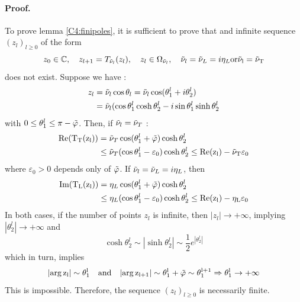 \paragraph*{Proof.} To prove lemma \ref{C4:finipoles}, it is sufficient to prove that and infinite sequence $(z_l)_{l\geq0}$ of the form
\begin{equation}
z_0 \in \mathbb{C}, \hspace{1em} z_{l+1}=T_{\tilde{\nu}_l}(z_l), \hspace{1em} z_l\in\Omega_{\tilde{\nu}_l}, \hspace{1em} \tilde{\nu}_l=\tilde{\nu}_L=i\eta_L \rm or \tilde{\nu}_l=\tilde{\nu}_T
\end{equation}
does not exist. Suppose we have :
\begin{equation}
\begin{split}
z_l&=\tilde{\nu}_l\cos\theta_l=\tilde{\nu}_l\cos(\theta_1^l+i\theta_2^l)\\
&=\tilde{\nu}_l(\cos\theta_1^l\cosh\theta_2^l-i\sin\theta_1^l\sinh\theta_2^l
\end{split}
\end{equation}
with $0\leq \theta_1^l\leq \pi-\tilde{\varphi}$. Then, if $\tilde{\nu}_l=\tilde{\nu}_T$ :
\begin{equation}
\begin{split}
\rm Re(T_T(z_l))&=\tilde{\nu}_T\cos(\theta_1^l+\tilde{\varphi})\cosh\theta_2^l\\
&\leq\tilde{\nu}_T(\cos\theta_1^l-\varepsilon_0)\cosh\theta_2^l\leq \rm Re(z_l)-\tilde{\nu}_T \varepsilon_0
\end{split}
\end{equation}
where $\varepsilon_0>0$ depends only of $\tilde{\varphi}$. If $\tilde{\nu}_l=\tilde{\nu}_L=i\eta_L$, then
\begin{equation}
\begin{split}
\rm Im(T_L(z_l))&=\eta_L\cos(\theta_1^l+\tilde{\varphi})\cosh\theta_2^l\\
&\leq\eta_L(\cos\theta_1^l-\varepsilon_0)\cosh\theta_2^l\leq \rm Re(z_l)-\eta_L \varepsilon_0
\end{split}
\end{equation}
In both cases, if the number of points $z_l$ is infinite, then $|z_l| \rightarrow +\infty$, implying $|\theta_2^l| \rightarrow +\infty$ and
\begin{equation}
\cosh\theta_2^l \sim |\sinh\theta_2^l| \sim \frac{1}{2} e^{|\theta_2^l|}
\end{equation}
which in turn, implies
\begin{equation}
|\rm arg \, z_l| \sim \theta_1^l \hspace{1em}\rm and \hspace{1em}|\rm arg \,z_{l+1}| \sim \theta_1^l+\tilde{\varphi} \sim \theta_1^{l+1} \Rightarrow \theta_1^l \rightarrow +\infty
\end{equation}
This is impossible. Therefore, the sequence $(z_l)_{l\geq 0}$ is necessarily finite.
